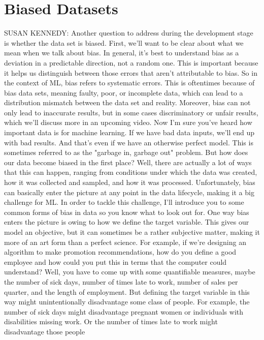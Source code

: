 \section{Biased Datasets}

SUSAN KENNEDY: Another question to address during the development stage
is whether the data set is biased.
First, we'll want to be clear about what we mean when we talk about bias.
In general, it's best to understand bias as a deviation
in a predictable direction, not a random one.
This is important because it helps us distinguish between those errors that
aren't attributable to bias.
So in the context of ML, bias refers to systematic errors.
This is oftentimes because of bias data sets,
meaning faulty, poor, or incomplete data,
which can lead to a distribution mismatch between the data set
and reality.
Moreover, bias can not only lead to inaccurate results, but in some cases
discriminatory or unfair results, which we'll
discuss more in an upcoming video.
Now I'm sure you've heard how important data is for machine learning.
If we have bad data inputs, we'll end up with bad results.
And that's even if we have an otherwise perfect model.
This is sometimes referred to as the "garbage in, garbage out" problem.
But how does our data become biased in the first place?
Well, there are actually a lot of ways that this
can happen, ranging from conditions under which the data was created,
how it was collected and sampled, and how it was processed.
Unfortunately, bias can basically enter the picture
at any point in the data lifecycle, making it a big challenge for ML.
In order to tackle this challenge, I'll introduce you
to some common forms of bias in data so you know what to look out for.
One way bias enters the picture is owing to how we define the target variable.
This gives our model an objective, but it can sometimes
be a rather subjective matter, making it more
of an art form than a perfect science.
For example, if we're designing an algorithm
to make promotion recommendations, how do you define a good employee
and how could you put this in terms that the computer could understand?
Well, you have to come up with some quantifiable measures, maybe
the number of sick days, number of times late to work,
number of sales per quarter, and the length of employment.
But defining the target variable in this way might unintentionally disadvantage
some class of people.
For example, the number of sick days might
disadvantage pregnant women or individuals
with disabilities missing work.
Or the number of times late to work might disadvantage those people
